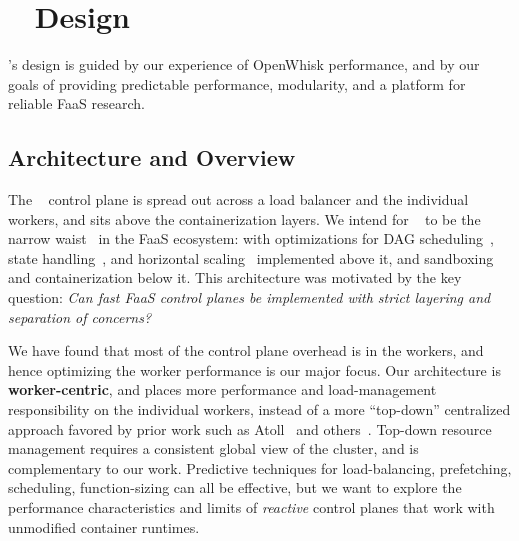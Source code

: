 \section{\sysname~ Design}
\label{sec:design}


\sysname's design is guided by our experience of OpenWhisk performance, and by our goals of providing predictable performance, modularity, and a platform for reliable FaaS research.

\subsection{Architecture and Overview}
\label{sec:design:arch}

The \sysname~ control plane is spread out across a load balancer and the individual workers, and sits above the containerization layers. 
We intend for \sysname~ to be the narrow waist~\cite{popa_http_2010} in the FaaS ecosystem: with optimizations for DAG scheduling~\cite{zhou_qos-aware_2022}, state handling~\cite{sreekanti2020cloudburst}, and horizontal scaling~\cite{faaslb-hpdc22} implemented above it, and sandboxing and containerization below it.  
This architecture was motivated by the key question: \emph{Can fast FaaS control planes be implemented with strict layering and separation of concerns?}


We have found that most of the control plane overhead is in the workers, and hence optimizing the worker performance is our major focus.
%
Our architecture is \textbf{worker-centric}, and places more performance and load-management responsibility on the individual workers, instead of a more ``top-down'' centralized approach favored by prior work such as Atoll~\cite{singhvi2021atoll} and others~\cite{kaffes_centralized_2019, kaffes_hermod_2022}.
Top-down resource management requires a consistent global view of the cluster, and is complementary to our work. 
Predictive techniques for load-balancing, prefetching, scheduling, function-sizing can all be effective, but we want to explore the performance characteristics and limits of \emph{reactive} control planes that work with unmodified container runtimes. 

